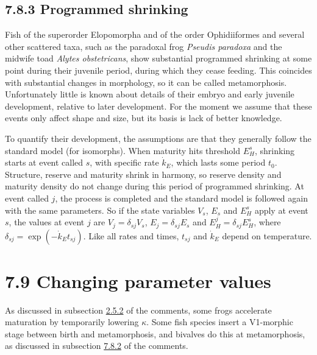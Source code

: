 \subsection*{7.8.3 Programmed shrinking}
{}
\label{sec_c:programmed_shrinking}

Fish of the superorder Elopomorpha and of the order Ophidiiformes and several other scattered taxa, such as the paradoxal frog \emph{Pseudis paradoxa} and the midwife toad \emph{Alytes obstetricans}, show substantial programmed shrinking at some point during their juvenile period, during which they cease feeding.
This coincides with substantial changes in morphology, so it can be called metamorphosis.
Unfortunately little is known about details of their embryo and early juvenile development, relative to later development.
For the moment we assume that these events only affect shape and size, but its basis is lack of better knowledge.

To quantify their development, the assumptions are that they generally follow the standard model (for isomorphs).
When maturity hits threshold $E_H^s$, shrinking starts at event called $s$, with specific rate $\dot{k}_E$, which lasts some period $t_0$.
Structure, reserve and maturity shrink in harmony, so reserve density and maturity density do not change during this period of programmed shrinking. 
At event called $j$, the process is completed and the standard model is followed again with the same parameters.
So if the state variables $V_s$, $E_s$ and $E_H^s$ apply at event $s$, the values at event $j$ are $V_j = \delta_{sj} V_s$, $E_j = \delta_{sj} E_s$ and $E_H^j = \delta_{sj} E_H^s$, where $\delta_{sj} = \exp(-\dot{k}_E t_{sj})$.
Like all rates and times, $t_{sj}$ and $\dot{k}_E$ depend on temperature.
 

\section*{7.9 Changing parameter values}
{}
\label{sec_c:par_change}

As discussed in subsection \hyperref[ssec_c:maturation]{2.5.2} of the comments, some frogs accelerate maturation by temporarily lowering $\kappa$.
Some fish species insert a V1-morphic stage between birth and metamorphosis, and bivalves do this at metamorphosis, as discussed in subsection \hyperref[sec_c:metamorphosis_b]{7.8.2} of the comments.

